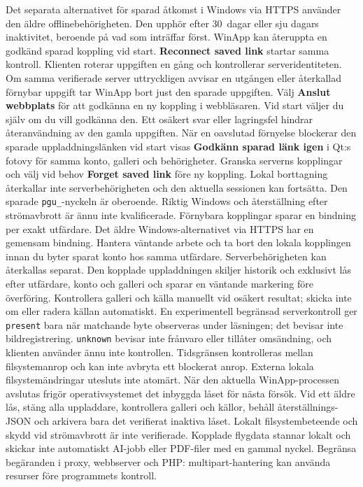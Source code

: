 \documentclass[11pt,a4paper]{article}
\newcommand{\ui}[1]{\textbf{#1}}
\begin{document}
Det separata alternativet för sparad åtkomst i Windows via HTTPS använder
den äldre offlinebehörigheten. Den upphör efter 30~dagar eller sju dagars
inaktivitet, beroende på vad som inträffar först. WinApp kan återuppta en
godkänd sparad koppling vid start.
\ui{Reconnect saved link}
startar samma kontroll. Klienten roterar uppgiften en gång och kontrollerar
serveridentiteten. Om samma verifierade server uttryckligen avvisar en
utgången eller återkallad förnybar uppgift tar WinApp bort just den sparade
uppgiften. Välj \ui{Anslut webbplats} för att godkänna en ny koppling i
webbläsaren. Vid start väljer du själv om du vill godkänna den.
Ett osäkert svar eller lagringsfel
hindrar återanvändning av den gamla uppgiften. När en oavslutad förnyelse
blockerar den sparade uppladdningslänken vid start visas
\ui{Godkänn sparad länk igen} i Qt:s fotovy för samma konto, galleri och
behörigheter. Granska serverns kopplingar och
välj vid behov \ui{Forget saved link} före ny koppling. Lokal borttagning
återkallar inte serverbehörigheten och den aktuella sessionen kan fortsätta.
Den sparade \texttt{pgu\_}-nyckeln är oberoende. Riktig Windows och
återställning efter strömavbrott är ännu inte kvalificerade. Förnybara kopplingar sparar en bindning per exakt utfärdare.
Det äldre Windows-alternativet via HTTPS har en gemensam bindning.
Hantera väntande arbete och ta bort den lokala kopplingen innan du byter
sparat konto hos samma utfärdare. Serverbehörigheten kan återkallas separat.
Den kopplade
uppladdningen skiljer historik och exklusivt lås efter utfärdare,
konto och galleri och sparar en väntande markering före överföring. Kontrollera
galleri och källa manuellt vid osäkert resultat; skicka inte om eller radera
källan automatiskt. En experimentell begränsad serverkontroll ger
\texttt{present} bara när matchande byte observeras under läsningen; det bevisar
inte bildregistrering. \texttt{unknown} bevisar inte frånvaro eller tillåter
omsändning, och klienten använder ännu inte kontrollen. Tidsgränsen kontrolleras
mellan filsystemanrop och kan inte avbryta ett blockerat anrop. Externa lokala
filsystemändringar utesluts inte atomärt. När den aktuella WinApp-processen
avslutas frigör operativsystemet det inbyggda låset för nästa försök. Vid ett
äldre lås, stäng alla uppladdare, kontrollera galleri och källor, behåll
återställnings-JSON och arkivera bara det verifierat inaktiva låset.
Lokalt filsystembeteende och skydd vid strömavbrott är inte
verifierade. Kopplade flygdata stannar lokalt och skickar inte automatiskt
AI-jobb eller PDF-filer med en gammal nyckel. Begränsa begäranden i proxy,
webbserver och PHP: multipart-hantering kan använda resurser före programmets
kontroll.
\end{document}
